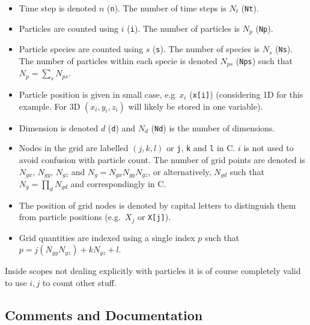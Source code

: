 \documentclass[10pt,a4paper]{article}
\begin{document}
\begin{itemize}
	\item Time step is denoted $n$ (\lstinline$n$). The number of time steps is $N_t$ (\lstinline$Nt$).
	\item Particles are counted using $i$ (\lstinline$i$). The number of particles is $N_p$ (\lstinline$Np$).
	\item Particle species are counted using $s$ (\lstinline$s$). The number of species is $N_s$ (\lstinline$Ns$). The number of particles within each specie is denoted $N_{ps}$ (\lstinline$Nps$) such that $N_p=\sum_sN_{ps}$.
	\item Particle position is given in small case, e.g\ $x_i$ (\lstinline$x[i]$) (considering 1D for this example. For 3D $(x_i,y_i,z_i)$ will likely be stored in one variable).
	\item Dimension is denoted $d$ (\lstinline$d$) and $N_d$ (\lstinline$Nd$) is the number of dimensions.
	\item Nodes in the grid are labelled $(j,k,l)$ or \lstinline$j$, \lstinline$k$ and \lstinline$l$ in C. $i$ is not used to avoid confusion with particle count. The number of grid points are denoted is $N_{gx}$, $N_{gy}$, $N_{gz}$ and $N_g=N_{gx}N_{gy}N_{gz}$, or alternatively, $N_{gd}$ such that $N_g=\prod_dN_{gd}$ and correspondingly in C.
	\item The position of grid nodes is denoted by capital letters to distinguish them from particle positions (e.g.\ $X_j$ or \lstinline$X[j]$).
	\item Grid quantities are indexed using a single index $p$ such that $p=j(N_{gy}N_{gz})+kN_{gz}+l$.
\end{itemize}

Inside scopes not dealing explicitly with particles it is of course completely valid to use $i, j$ to count other stuff.

 


\subsection{Comments and Documentation}
\end{document}
